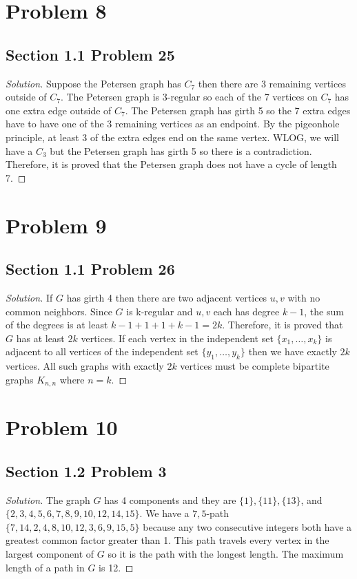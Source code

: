 \documentclass[12pt]{article}
\newenvironment{solution}{\begin{proof}[Solution]}{\end{proof}}
\begin{document}
\section*{Problem 8}
\subsection*{Section 1.1 Problem 25}
\begin{solution}
    Suppose the Petersen graph has \(C_7\) then there are 3 remaining vertices
    outside of \(C_7\). The Petersen graph is 3-regular so each of the 7
    vertices on \(C_7\) has one extra edge outside of \(C_7\). The Petersen
    graph has girth 5 so the 7 extra edges have to have one of the 3 remaining
    vertices as an endpoint. By the pigeonhole principle, at least 3 of the
    extra edges end on the same vertex. WLOG, we will have a \(C_3\) but the
    Petersen graph has girth 5 so there is a contradiction. Therefore, it is
    proved that the Petersen graph does not have a cycle of length 7.
\end{solution}

\section*{Problem 9}
\subsection*{Section 1.1 Problem 26}
\begin{solution}
    If \(G\) has girth 4 then there are two adjacent vertices \(u, v\) with no
    common neighbors. Since \(G\) is k-regular and \(u,v\) each has degree
    \(k-1\), the sum of the degrees is at least \(k-1+1+1+k-1=2k\). Therefore,
    it is proved that \(G\) has at least \(2k\) vertices. If each vertex in the
    independent set \(\{x_1,\dots,x_{k}\}\) is adjacent to all vertices of
    the independent set \(\{y_1,\dots,y_{k}\}\) then we have exactly \(2k\)
    vertices. All such graphs with exactly \(2k\) vertices must be complete
    bipartite graphs \(K_{n,n}\) where \(n=k\).
\end{solution}

\section*{Problem 10}
\subsection*{Section 1.2 Problem 3}
\begin{solution}
    The graph \(G\) has 4 components and they are \(\{1\},\{11\},\{13\}\), and \\
    \(\{2,3,4,5,6,7,8,9,10,12,14,15\}\). We have a \(7,5\)-path \(\{7,14,2,4,8,10,12,3,6,9,15,5\}\)
    because any two consecutive integers both have a greatest common factor
    greater than 1. This path travels every vertex in the largest component of
    \(G\) so it is the path with the longest length. The maximum length of a
    path in \(G\) is 12.
\end{solution}
\end{document}
